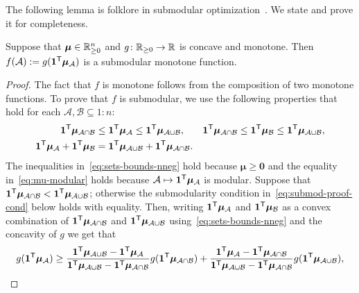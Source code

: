 The following lemma is folklore in submodular optimization~\cite[theorem~4.5.1]{Bilmes18}. We state and prove it for completeness.
\begin{lemma} \label{lem:submodular-concave}
  Suppose that $\bm{\mu}\in \mathbb{R}^n_{\ge 0}$ and $g \colon \mathbb{R}_{\ge 0} \to \mathbb{R}$ is concave and monotone. Then $f(\mathcal{A}) := g(\bm{1}^{\mathsf{T}}\bm{\mu}_{\mathcal{A}})$ is a submodular monotone function. 
\end{lemma}
\begin{proof}
  The fact that $f$ is monotone follows from the composition of two monotone functions. To prove that $f$ is submodular, we use the following properties that hold for each $\mathcal{A}, \mathcal{B} \subseteq 1{:}n$:
  \begin{align}
    \label{eq:sets-bounds-nneg}
    \bm{1}^{\mathsf{T}}\bm{\mu}_{\mathcal{A} \cap \mathcal{B}}
    &\le \bm{1}^{\mathsf{T}}\bm{\mu}_{\mathcal{A}} \le \bm{1}^{\mathsf{T}}\bm{\mu}_{\mathcal{A} \cup \mathcal{B}},
    &
    \bm{1}^{\mathsf{T}}\bm{\mu}_{\mathcal{A} \cap \mathcal{B}}
    &\le \bm{1}^{\mathsf{T}}\bm{\mu}_{\mathcal{B}} \le \bm{1}^{\mathsf{T}}\bm{\mu}_{\mathcal{A} \cup \mathcal{B}}, \\
    \label{eq:mu-modular}
    \bm{1}^{\mathsf{T}}\bm{\mu}_{\mathcal{A}} + \bm{1}^{\mathsf{T}}\bm{\mu}_{\mathcal{B}}
    &= \bm{1}^{\mathsf{T}}\bm{\mu}_{\mathcal{A} \cup \mathcal{B}} + \bm{1}^{\mathsf{T}}\bm{\mu}_{\mathcal{A} \cap \mathcal{B}}.
  \end{align}
The inequalities in~\eqref{eq:sets-bounds-nneg} hold because $\bm{\mu} \ge  \bm{0}$ and the equality in~\eqref{eq:mu-modular} holds because $\mathcal{A} \mapsto \bm{1}^{\mathsf{T}}\bm{\mu}_{\mathcal{A}}$ is modular. Suppose that $\bm{1}^{\mathsf{T}} \bm{\mu}_{\mathcal{A} \cap \mathcal{B}} < \bm{1}^{\mathsf{T}}\bm{\mu}_{\mathcal{A} \cup \mathcal{B}}$; otherwise the submodularity condition in~\eqref{eq:submod-proof-cond} below holds with equality.  Then, writing $\bm{1}^{\mathsf{T}}\bm{\mu}_{\mathcal{A}}$ and $\bm{1}^{\mathsf{T}}\bm{\mu}_{\mathcal{B}}$ as a convex combination of $\bm{1}^{\mathsf{T}}\bm{\mu}_{\mathcal{A}\cap \mathcal{B}}$ and $\bm{1}^{\mathsf{T}}\bm{\mu}_{\mathcal{A} \cup \mathcal{B}}$ using~\eqref{eq:sets-bounds-nneg} and the concavity of $g$ we get that
  \begin{align}
  \label{eq:ga-bound}
    g(\bm{1}\tr\bm{\mu}_{\mathcal{A}})
    &\ge
      \frac{\bm{1}\tr\bm{\mu}_{\mathcal{A} \cup \mathcal{B}} - \bm{1}\tr\bm{\mu}_{\mathcal{A}}}{\bm{1}\tr\bm{\mu}_{\mathcal{A} \cup \mathcal{B}} - \bm{1}\tr\bm{\mu}_{\mathcal{A} \cap \mathcal{B}}} g(\bm{1}\tr\bm{\mu}_{\mathcal{A} \cap \mathcal{B}}) + 
      \frac{\bm{1}\tr\bm{\mu}_{\mathcal{A}} - \bm{1}\tr\bm{\mu}_{\mathcal{A} \cap \mathcal{B}}}{\bm{1}\tr\bm{\mu}_{\mathcal{A} \cup \mathcal{B}} - \bm{1}\tr\bm{\mu}_{\mathcal{A} \cap \mathcal{B}}} g(\bm{1}\tr\bm{\mu}_{\mathcal{A} \cup \mathcal{B}}), \\

\end{align}
\end{proof}
